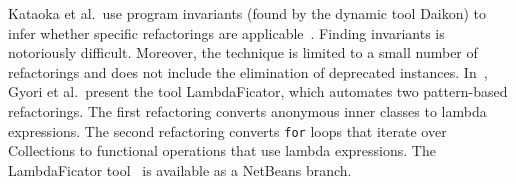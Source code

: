 \documentclass[sigconf]{acmart}
\begin{document}
%
%
%
%
Kataoka et al.~use program invariants (found by the dynamic tool Daikon) to
infer
%
%
whether specific refactorings are
applicable~\cite{Kataoka:2001:ASP:846228.848644}.  Finding invariants is
notoriously difficult.  Moreover, the technique is limited to a small number
of refactorings and does not include the elimination of deprecated
instances.  In~\cite{conf/sigsoft/GyoriFDL13}, Gyori et al.~present the tool
{\sc LambdaFicator}, which automates two pattern-based refactorings.  The
first refactoring converts anonymous inner classes to lambda expressions.
The second refactoring converts {\tt for} loops that iterate over
Collections to functional operations that use lambda expressions.  The {\sc
LambdaFicator} tool~\cite{DBLP:conf/icse/FranklinGLD04} is available as a
NetBeans branch.



%
%
%
\end{document}
